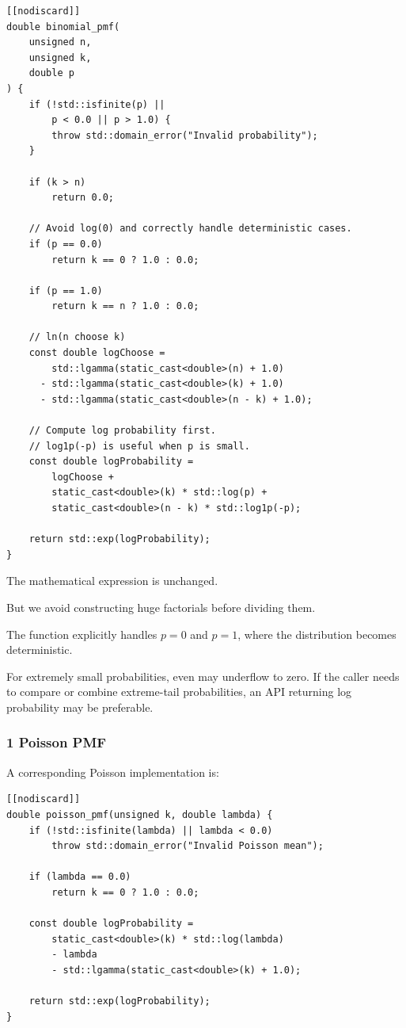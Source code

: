 \begin{verbatim}
[[nodiscard]]
double binomial_pmf(
    unsigned n,
    unsigned k,
    double p
) {
    if (!std::isfinite(p) ||
        p < 0.0 || p > 1.0) {
        throw std::domain_error("Invalid probability");
    }

    if (k > n)
        return 0.0;

    // Avoid log(0) and correctly handle deterministic cases.
    if (p == 0.0)
        return k == 0 ? 1.0 : 0.0;

    if (p == 1.0)
        return k == n ? 1.0 : 0.0;

    // ln(n choose k)
    const double logChoose =
        std::lgamma(static_cast<double>(n) + 1.0)
      - std::lgamma(static_cast<double>(k) + 1.0)
      - std::lgamma(static_cast<double>(n - k) + 1.0);

    // Compute log probability first.
    // log1p(-p) is useful when p is small.
    const double logProbability =
        logChoose +
        static_cast<double>(k) * std::log(p) +
        static_cast<double>(n - k) * std::log1p(-p);

    return std::exp(logProbability);
}
\end{verbatim}

The mathematical expression is unchanged.

But we avoid constructing huge factorials before dividing them.

The function explicitly handles \(p=0\) and \(p=1\), where the distribution becomes deterministic.

For extremely small probabilities, even  may underflow to zero. If the caller needs to compare or combine extreme-tail probabilities, an API returning log probability may be preferable.

\subsubsection{1 Poisson PMF}\label{02-foundations-ii-ch031-poisson-pmf}

\hypertarget{02-foundations-ii-ch031-poisson-pmf}{}

A corresponding Poisson implementation is:

\begin{verbatim}
[[nodiscard]]
double poisson_pmf(unsigned k, double lambda) {
    if (!std::isfinite(lambda) || lambda < 0.0)
        throw std::domain_error("Invalid Poisson mean");

    if (lambda == 0.0)
        return k == 0 ? 1.0 : 0.0;

    const double logProbability =
        static_cast<double>(k) * std::log(lambda)
        - lambda
        - std::lgamma(static_cast<double>(k) + 1.0);

    return std::exp(logProbability);
}
\end{verbatim}

